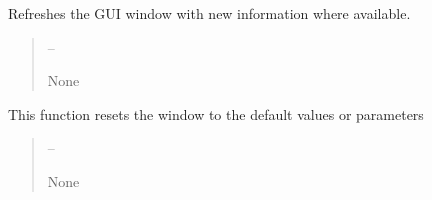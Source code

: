 \documentclass[letterpaper,11pt,english]{sphinxmanual}
\begin{document}
\begin{savenotes}
\begin{fulllineitems}
\begin{savenotes}\begin{fulllineitems}
\label{\detokenize{code/opihiexarata.gui.automatic:opihiexarata.gui.automatic.OpihiAutomaticWindow.refresh_window}}
\pysigstartsignatures
{}
\pysigstopsignatures
\sphinxAtStartPar
Refreshes the GUI window with new information where available.
\begin{quote}\begin{description}
\sphinxAtStartPar
{} – 

\sphinxAtStartPar
None

\end{description}\end{quote}

\end{fulllineitems}\end{savenotes}


\begin{savenotes}\begin{fulllineitems}
\label{\detokenize{code/opihiexarata.gui.automatic:opihiexarata.gui.automatic.OpihiAutomaticWindow.reset_window}}
\pysigstartsignatures
{}
\pysigstopsignatures
\sphinxAtStartPar
This function resets the window to the default values or
parameters
\begin{quote}\begin{description}
\sphinxAtStartPar
{} – 

\sphinxAtStartPar
None

\end{description}\end{quote}

\end{fulllineitems}\end{savenotes}



\end{fulllineitems}
\end{savenotes}
\end{document}
